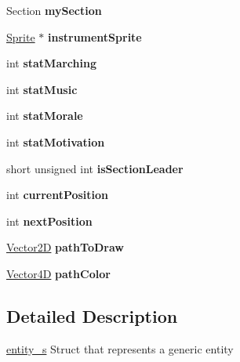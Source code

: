 \begin{DoxyCompactItemize}
\mbox{\label{structentity__s_ad81be2aae4b919dfe48fcee74129eb10}} 
Section {\bfseries my\+Section}
\item 
\mbox{\label{structentity__s_a516cbd18313c08e3a86792d9945dd4fb}} 
\hyperlink{struct_sprite___s}{Sprite} $\ast$ {\bfseries instrument\+Sprite}
\item 
\mbox{\label{structentity__s_a2f5d2a226adffc3719a826f610de9be2}} 
int {\bfseries stat\+Marching}
\item 
\mbox{\label{structentity__s_ae5341e0b53331ca3c7e81726895e68fa}} 
int {\bfseries stat\+Music}
\item 
\mbox{\label{structentity__s_ae988c5b9868840a73604a8d281c650ef}} 
int {\bfseries stat\+Morale}
\item 
\mbox{\label{structentity__s_ab44ea035652247e02518c0080e884c64}} 
int {\bfseries stat\+Motivation}
\item 
\mbox{\label{structentity__s_ace21314f7800da6d1b36dd730eba6e05}} 
short unsigned int {\bfseries is\+Section\+Leader}
\item 
\mbox{\label{structentity__s_aa662efe820ee154e4fc6e5ef1a5af99a}} 
int {\bfseries current\+Position}
\item 
\mbox{\label{structentity__s_a3ce77101c89cf9167be88f050bd42f72}} 
int {\bfseries next\+Position}
\item 
\mbox{\label{structentity__s_af06b629e4b5c3f2d9070ff0c4e3907a0}} 
\hyperlink{struct_vector2_d}{Vector2D} {\bfseries path\+To\+Draw}
\item 
\mbox{\label{structentity__s_acc5d76b31818103e5e1b83cbc193e613}} 
\hyperlink{struct_vector4_d}{Vector4D} {\bfseries path\+Color}
\end{DoxyCompactItemize}


\subsection{Detailed Description}
\hyperlink{structentity__s}{entity\+\_\+s} Struct that represents a generic entity 

